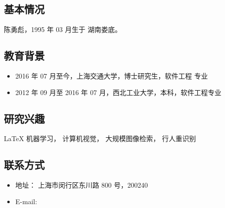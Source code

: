 
\begin{resume}
  \subsection*{基本情况}
    陈勇彪，1995 年 03 月生于 湖南娄底。

  \subsection*{教育背景}
  \begin{itemize}
    \item 2016 年 07 月至今，上海交通大学，博士研究生，软件工程 专业
    \item 2012 年 09 月至 2016 年 07 月，西北工业大学，本科，软件工程专业
  \end{itemize}

  \subsection*{研究兴趣}
    \LaTeX{} 机器学习， 计算机视觉， 大规模图像检索， 行人重识别

  \subsection*{联系方式}
  \begin{itemize}
    \item 地址： 上海市闵行区东川路 800 号，200240
    \item E-mail: 
  \end{itemize}
\end{resume}

